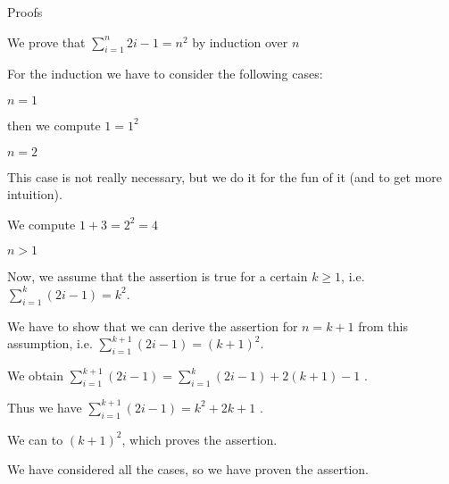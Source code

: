\begin{sfragment}{Proofs}
\begin{mdframed}
  \begin{sproof}[id=simple-proof]
  {We prove that $\sum_{i=1}^n{2i-1}=n^{2}$ by induction over $n$}
  \begin{spfcases}{For the induction we have to consider the following cases:}
    \begin{spfcase}{$n=1$}
      \begin{spfstep}[type=inline] then we compute $1=1^2$\end{spfstep}
    \end{spfcase}
    \begin{spfcase}{$n=2$}
      \begin{spfcomment}[type=inline]
         This case is not really necessary, but we do it for the fun
         of it (and to get more intuition).
      \end{spfcomment}
      \begin{spfstep}[type=inline]
         We compute $1+3=2^{2}=4$
      \end{spfstep}
    \end{spfcase}
    \begin{spfcase}{$n>1$}
      \begin{spfstep}[type=hypothesis,id=ind-hyp]
        Now, we assume that the assertion is true for a certain $k\geq 1$, i.e.
        $\sum_{i=1}^k{(2i-1)}=k^{2}$.
      \end{spfstep}
      \begin{spfcomment}
        We have to show that we can derive the assertion for $n=k+1$ from this
        assumption, i.e.  $\sum_{i=1}^{k+1}{(2i-1)}=(k+1)^{2}$.
      \end{spfcomment}
      \begin{spfstep}[id=splitit]
        We obtain $\sum_{i=1}^{k+1}{(2i-1)}=\sum_{i=1}^k{(2i-1)}+2(k+1)-1$
       .
     \end{spfstep}
     \begin{spfstep}[id=byindhyp]
       Thus we have $\sum_{i=1}^{k+1}{(2i-1)}=k^2+2k+1$
       .
     \end{spfstep}
     \begin{spfstep}[type=conclusion]
       We can  to
       $(k+1)^2$, which proves the assertion.
     \end{spfstep}
   \end{spfcase}
   \begin{spfstep}[type=conclusion]
     We have considered all the cases, so we have proven the assertion.
   \end{spfstep}
  \end{spfcases}
\end{sproof}
\end{mdframed}


\end{sfragment}
